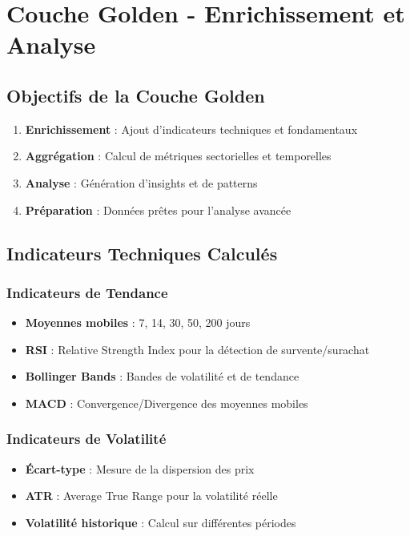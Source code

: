 \section{Couche Golden - Enrichissement et Analyse}

\subsection{Objectifs de la Couche Golden}

\begin{enumerate}
    \item \textbf{Enrichissement} : Ajout d'indicateurs techniques et fondamentaux
    \item \textbf{Aggrégation} : Calcul de métriques sectorielles et temporelles
    \item \textbf{Analyse} : Génération d'insights et de patterns
    \item \textbf{Préparation} : Données prêtes pour l'analyse avancée
\end{enumerate}

\subsection{Indicateurs Techniques Calculés}

\subsubsection{Indicateurs de Tendance}

\begin{itemize}
    \item \textbf{Moyennes mobiles} : 7, 14, 30, 50, 200 jours
    \item \textbf{RSI} : Relative Strength Index pour la détection de survente/surachat
    \item \textbf{Bollinger Bands} : Bandes de volatilité et de tendance
    \item \textbf{MACD} : Convergence/Divergence des moyennes mobiles
\end{itemize}

\subsubsection{Indicateurs de Volatilité}

\begin{itemize}
    \item \textbf{Écart-type} : Mesure de la dispersion des prix
    \item \textbf{ATR} : Average True Range pour la volatilité réelle
    \item \textbf{Volatilité historique} : Calcul sur différentes périodes
\end{itemize}

